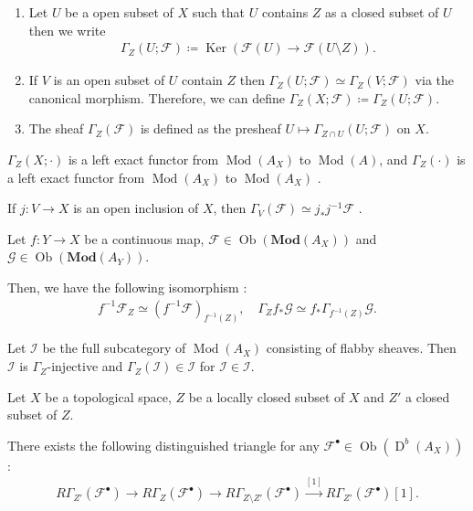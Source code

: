 \documentclass[a4paper,dvipdfmx,reqno,12pt]{amsart}
\theoremstyle{definition}
\newcommand{\deq}{\coloneqq}
\newcommand{\mcal}[1]{\mathcal{#1}}%
\newcommand{\opn}[1]{\operatorname{#1}}
\newcommand{\catn}[1]{\mathbf{#1}}
\newcommand{\xto}[1]{\xrightarrow{#1}}
\numberwithin{equation}{section}
\begin{document}
\begin{enumerate}
\item Let $U$ be a open subset of $X$ such that $U$ contains
$Z$ as a closed subset of $U$ then we write
\begin{align}
  \Gamma_Z(U;\mcal{F})\deq \opn{Ker}(\mcal{F}(U) \to 
\mcal{F}(U\setminus Z)).
\end{align}
\item If $V$ is an open subset of $U$ contain $Z$ then
$\Gamma_{Z}(U;\mcal{F})\simeq \Gamma_{Z}(V;\mcal{F})$
via the canonical morphism. Therefore, we can define
$\Gamma_{Z}(X;\mcal{F})\deq \Gamma_{Z}(U;\mcal{F})$.
\item The sheaf $\Gamma_{Z}(\mcal{F})$ is defined as the presheaf 
$U\mapsto \Gamma_{Z\cap U}(U;\mcal{F})$ on $X$.
\end{enumerate}

$\Gamma_Z(X;\cdot)$ is a left exact functor from 
$\opn{Mod}(A_X)$ to $\opn{Mod}(A)$,
and $\Gamma_{Z}(\cdot)$ is a left exact functor from
$\opn{Mod}(A_X)$ to $\opn{Mod}(A_X)$ 
\cite[Proposition 2.3.9 (i)]{MR1299726}.



If $j\colon V\to X$ is an open inclusion of $X$, then 
$\Gamma_V(\mathcal{F})\simeq j_*j^{-1}\mathcal{F}$ 
\cite[Proposition 2.3.9 (iii)]{MR1299726}.

Let $f\colon Y\to X$ be a continuous map,
$\mathcal{F}\in \opn{Ob}(\catn{Mod}(A_X))$
and $\mathcal{G}\in\opn{Ob}(\catn{Mod}(A_Y))$.

Then, we have the following isomorphism 
\cite[(2.3.19)-(2.3.20)]{MR1299726}:
\begin{align}
f^{-1}\mathcal{F}_Z\simeq 
(f^{-1}\mathcal{F})_{f^{-1}(Z)},\quad 
\Gamma_Zf_*\mathcal{G}\simeq f_*\Gamma_{f^{-1}(Z)}
\mathcal{G}.
\end{align}

Let $\mathscr{I}$ be the full subcategory of 
$\opn{Mod}(A_X)$ consisting of flabby sheaves. 
Then $\mathscr{I}$ is $\Gamma_{Z}$-injective and
$\Gamma_{Z}(\mathcal{I})\in\mathscr{I}$ for 
$\mathcal{I}\in \mathscr{I}$.

Let $X$ be a topological space, $Z$ be a locally 
closed subset of $X$ and $Z'$ a closed subset of $Z$.

There exists the following distinguished triangle 
for any $\mathcal{F}^{\bullet}\in \opn{Ob}(\opn{D}^{b}(A_X))$ 
\cite[(2.6.32)]{MR1299726}:
\begin{align} \label{equation-exact-local}
  R\Gamma_{Z'}(\mcal{F}^{\bullet})\to 
R\Gamma_{Z}(\mcal{F}^{\bullet})\to 
R\Gamma_{Z\setminus Z'}(\mcal{F}^{\bullet})\xto{[1]} 
R\Gamma_{Z'}(\mcal{F}^{\bullet})[1].
\end{align}
\end{document}
